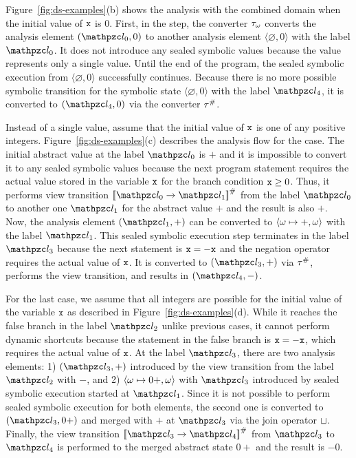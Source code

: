 Figure~\ref{fig:ds-examples}(b) shows the analysis with the combined domain when
the initial value of $\texttt{x}$ is $0$.  First, in the \triagename step,
the converter ${\tau}_\omega$ converts the analysis element $(\lab_0, 0)$ to
another analysis element $\langle \varnothing, 0 \rangle$ with the label
$\lab_0$.  It does not introduce any sealed symbolic values because
the value represents only a single value.  Until the end of the program, the
sealed symbolic execution from $\langle \varnothing, 0 \rangle$ successfully
continues.  Because there is no more possible symbolic transition for the
symbolic state $\langle \varnothing, 0 \rangle$ with the label $\lab_4$,
it is converted to $(\lab_4, 0)$ via the converter ${\tau}^{\#}$.

Instead of a single value, assume that the initial value of $\texttt{x}$ is one of
any positive integers.  Figure~\ref{fig:ds-examples}(c) describes the analysis
flow for the case.  The initial abstract value at the label $\lab_0$ is
$+$ and it is impossible to convert it to any sealed symbolic values because the
next program statement requires the actual value stored in the variable $\texttt{x}$
for the branch condition $\texttt{x} \geq 0$.  Thus, it performs view transition
$\viewtrans{\lab_0}{\lab_1}$ from the label $\lab_0$ to another one $\lab_1$ for
the abstract value $+$ and the result is also $+$.  Now, the analysis element
$(\lab_1, +)$ can be converted to $\langle \omega \mapsto +, \omega \rangle$
with the label $\lab_1$.  This sealed symbolic execution step terminates in the
label $\lab_3$ because the next statement is $\texttt{x} = -\texttt{x}$ and the negation
operator requires the actual value of $\texttt{x}$.  It is converted to $(\lab_3, +)$ via ${\tau}^{\#}$,
performs the view transition, and results in $(\lab_4, -)$.

For the last case, we assume that all integers are possible for the initial
value of the variable $\texttt{x}$ as described in Figure~\ref{fig:ds-examples}(d).
While it reaches the false branch in the label $\lab_2$ unlike previous cases,
it cannot perform dynamic shortcuts because the statement in the false
branch is $\texttt{x} = -\texttt{x}$, which requires the actual value of $\texttt{x}$.
At the label $\lab_3$, there are two analysis
elements: 1) $(\lab_3, +)$ introduced by the view transition from the label $\lab_2$
with $-$, and 2) $\langle \omega \mapsto 0+, \omega \rangle$ with $\lab_3$
introduced by sealed symbolic execution started at $\lab_1$.  Since it
is not possible to perform sealed symbolic execution for both elements, the
second one is converted to $(\lab_3, 0+)$ and merged with $+$ at $\lab_3$ via the
join operator $\sqcup$.  Finally, the view transition
$\viewtrans{\lab_3}{\lab_4}$ from $\lab_3$ to $\lab_4$ is performed to the
merged abstract state $0+$ and the result is $-0$.

